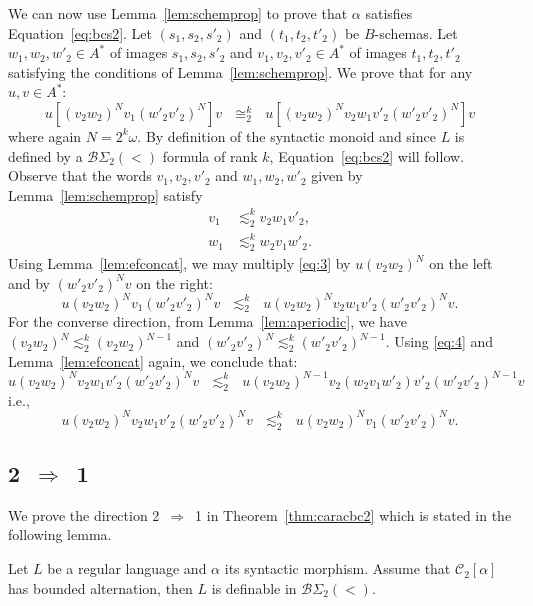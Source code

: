 \documentclass[envcountsame]{llncs}
\newcommand\Cs{\ensuremath{\mathcal{C}}\xspace}
\newcommand\Cstwo{\ensuremath{\Cs_2}\xspace}
\newcommand{\bswd}{\ensuremath{\mathcal{B}\Sigma_{2}(<)}\xspace}
\newcommand\sieq[2]{\ensuremath{\lesssim^{#1}_{#2}}\xspace}
\newcommand\ksieq[1]{\sieq{k}{#1}}
\newcommand\bceq[2]{\ensuremath{\cong^{#1}_{#2}}\xspace}
\newcommand\kbceq[1]{\bceq{k}{#1}}
\begin{document}
We can now use Lemma~\ref{lem:schemprop} to prove that $\alpha$
satisfies Equation~\eqref{eq:bcs2}. Let $(s_1,s_2,s'_2)$ and
$(t_1,t_2,t'_2)$ be $B$-schemas. Let $w_1,w_2,w'_2 \in A^*$ of images
$s_1,s_2,s'_2$ and $v_1,v_2,v'_2 \in A^*$ of images $t_1,t_2,t'_2$
satisfying the conditions of Lemma~\ref{lem:schemprop}. We prove that
for any $u,v \in A^*$:
\begin{equation}
  u[(v_2w_2)^{N}v_1(w'_2v'_2)^{N}]v ~~~\kbceq{2}~~~
  u[(v_2w_2)^{N}v_2w_1v'_2(w'_2v'_2)^{N}]v  \label{eq:bcnec2}
\end{equation}
where again $N=2^k\omega$. By definition of the syntactic monoid and since $L$ is defined by a 
\bswd formula of rank $k$, Equation~\eqref{eq:bcs2} will
follow. Observe that the words $v_1,v_2,v'_2$ and $w_1,w_2,w'_2$ given by
Lemma~\ref{lem:schemprop} satisfy
\begin{align}
  \label{eq:3}
  v_1 &\ksieq{2} v_2w_1v'_2,\\
  \label{eq:4}
  w_1 &\ksieq{2} w_2v_1w'_2.
\end{align}
Using Lemma~\ref{lem:efconcat}, we may multiply \eqref{eq:3} by
$u(v_2w_2)^{N}$ on the left and by $(w'_2v'_2)^{N}v$ on the right:
\[
u(v_2w_2)^{N}v_1(w'_2v'_2)^{N}v ~~~\ksieq{2}~~~
u(v_2w_2)^{N}v_2w_1v'_2(w'_2v'_2)^{N}v.
\]
For the converse direction, from Lemma~\ref{lem:aperiodic}, we have 
$(v_2w_2)^{N} \ksieq{2} (v_2w_2)^{N-1}$
and $(w'_2v'_2)^{N} \ksieq{2}
(w'_2v'_2)^{N-1}$. Using   \eqref{eq:4} and Lemma~\ref{lem:efconcat} again, we
conclude that:
\[u(v_2w_2)^{N}v_2w_1v'_2(w'_2v'_2)^{N}v ~~~\ksieq{2}~~~
u(v_2w_2)^{N-1}v_2(w_2v_1w'_2)v'_2(w'_2v'_2)^{N-1}v\]
i.e.,
\[u(v_2w_2)^{N}v_2w_1v'_2(w'_2v'_2)^{N}v~~~\ksieq{2}~~~u(v_2w_2)^{N}v_1(w'_2v'_2)^{N}v.\]

\subsection{2~$\Rightarrow$~1}

We prove the direction 2~$\Rightarrow$~1 in Theorem~\ref{thm:caracbc2}
which is stated in the following lemma. 

\begin{lemma} \label{lem:bcinter}
  Let $L$ be a regular language and $\alpha$ its syntactic
  morphism. Assume that $\Cstwo[\alpha]$ has bounded alternation, then
  $L$ is definable in \bswd.
\end{lemma}
\end{document}
